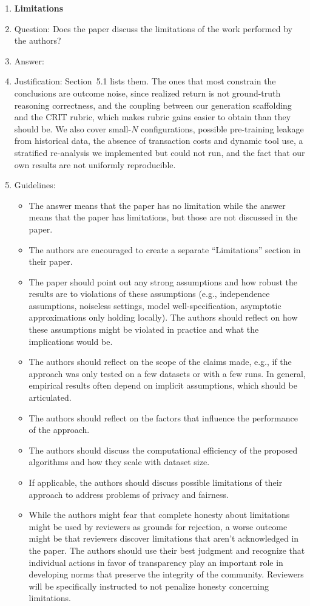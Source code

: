\begin{enumerate}
\item {\bf Limitations}
    \item[] Question: Does the paper discuss the limitations of the work performed by the authors?
    \item[] Answer: \answerYes{}
    \item[] Justification: Section~5.1 lists them. The ones that most constrain the conclusions are outcome noise, since realized return is not ground-truth reasoning correctness, and the coupling between our generation scaffolding and the CRIT rubric, which makes rubric gains easier to obtain than they should be. We also cover small-$N$ configurations, possible pre-training leakage from historical data, the absence of transaction costs and dynamic tool use, a stratified re-analysis we implemented but could not run, and the fact that our own results are not uniformly reproducible.
    \item[] Guidelines:
    \begin{itemize}
        \item The answer \answerNA{} means that the paper has no limitation while the answer \answerNo{} means that the paper has limitations, but those are not discussed in the paper.
        \item The authors are encouraged to create a separate ``Limitations'' section in their paper.
        \item The paper should point out any strong assumptions and how robust the results are to violations of these assumptions (e.g., independence assumptions, noiseless settings, model well-specification, asymptotic approximations only holding locally). The authors should reflect on how these assumptions might be violated in practice and what the implications would be.
        \item The authors should reflect on the scope of the claims made, e.g., if the approach was only tested on a few datasets or with a few runs. In general, empirical results often depend on implicit assumptions, which should be articulated.
        \item The authors should reflect on the factors that influence the performance of the approach.
        \item The authors should discuss the computational efficiency of the proposed algorithms and how they scale with dataset size.
        \item If applicable, the authors should discuss possible limitations of their approach to address problems of privacy and fairness.
        \item While the authors might fear that complete honesty about limitations might be used by reviewers as grounds for rejection, a worse outcome might be that reviewers discover limitations that aren't acknowledged in the paper. The authors should use their best judgment and recognize that individual actions in favor of transparency play an important role in developing norms that preserve the integrity of the community. Reviewers will be specifically instructed to not penalize honesty concerning limitations.
    \end{itemize}


\end{enumerate}
